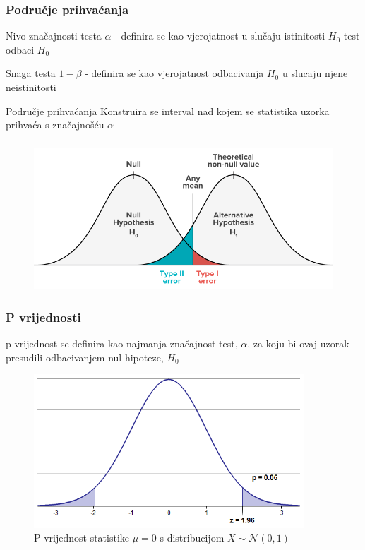 \documentclass{beamer}
\begin{document}
\begin{frame}
\frametitle{Područje prihvaćanja}

\begin{block}{Nivo značajnosti testa}
	$\alpha$ - definira se kao vjerojatnost u slučaju istinitosti $H_0$ test odbaci $H_0$
\end{block} \pause

\begin{block}{Snaga testa}
	$1-\beta$ - definira se kao vjerojatnost odbacivanja $H_0$ u slucaju njene neistinitosti
\end{block} \pause

\begin{block}{Područje prihvaćanja}
	Konstruira se interval nad kojem se statistika uzorka prihvaća s značajnošću $\alpha$
\end{block}

\end{frame}

\begin{frame}
\frametitle{}
\begin{figure}
\centering
\includegraphics[width=\textwidth,height=0.8\textheight,keepaspectratio]{type12.png}
\end{figure}
\end{frame}


\begin{frame}
\frametitle{P vrijednosti}
p vrijednost se definira kao najmanja značajnost test, $\alpha$, za koju bi ovaj uzorak presudili odbacivanjem nul hipoteze, $H_0$

\begin{figure}[ph]
    \centering
    \includegraphics[width=0.9\textwidth,height=0.7\textheight,keepaspectratio]{pvalue2.png}
    \caption{P vrijednost statistike $\mu = 0$ s distribucijom $X \sim \mathcal{N}(0,1)$}
	\label{fig:pvalue2}
\end{figure}
\end{frame}
\end{document}
